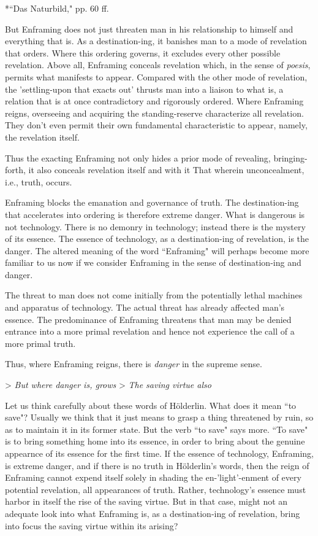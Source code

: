 \documentclass[12pt]{article}
\begin{document}
*``Das Naturbild," pp. 60 ff.

But Enframing does not just threaten man in his relationship to himself and everything that is. As a destination-ing, it banishes man to a mode of revelation that orders. Where this ordering governs, it excludes every other possible revelation. Above all, Enframing conceals revelation which, in the sense of \textit{p{\-o}esis}, permits what manifests to appear. Compared with the other mode of revelation, the 'settling-upon that exacts out' thrusts man into a liaison to what is, a relation that is at once contradictory and rigorously ordered. Where Enframing reigns, overseeing and acquiring the standing-reserve characterize all revelation. They don't even permit their own fundamental characteristic to appear, namely, the revelation itself.

Thus the exacting Enframing not only hides a prior mode of revealing, bringing-forth, it also conceals revelation itself and with it That wherein unconcealment, i.e., truth, occurs.

Enframing blocks the emanation and governance of truth. The destination-ing that accelerates into ordering is therefore extreme danger. What is dangerous is not technology. There is no demonry in technology; instead there is the mystery of its essence. The essence of technology, as a destination-ing of revelation, is the danger. The altered meaning of the word ``Enframing" will perhaps become more familiar to us now if we consider Enframing in the sense of destination-ing and danger.

The threat to man does not come initially from the potentially lethal machines and apparatus of technology. The actual threat has already affected man's essence. The predominance of Enframing threatens that man may be denied entrance into a more primal revelation and hence not experience the call of a more primal truth.

Thus, where Enframing reigns, there is \textit{danger} in the supreme sense.

> \textit{But where danger is, grows}
> \textit{The saving virtue also}

Let us think carefully about these words of H{\"o}lderlin. What does it mean ``to save"? Usually we think that it just means to grasp a thing threatened by ruin, so as to maintain it in its former state. But the verb ``to save" says more. ``To save" is to bring something home into its essence, in order to bring about the genuine appearnce of its essence for the first time. If the essence of technology, Enframing, is extreme danger, and if there is no truth in H{\"o}lderlin's words, then the reign of Enframing cannot expend itself solely in shading the en-'light'-enment of every potential revelation, all appearances of truth. Rather, technology's essence must harbor in itself the rise of the saving virtue. But in that case, might not an adequate look into what Enframing is, as a destination-ing of revelation, bring into focus the saving virtue within its arising? 
\end{document}
